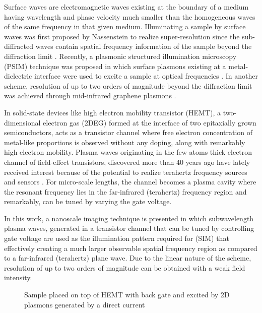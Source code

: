 \documentclass[11pt]{article}
\begin{document}
Surface waves are electromagnetic waves existing at the boundary of a medium having wavelength and phase velocity much smaller than the homogeneous waves of the same frequency in that given medium. Illuminating a sample by surface waves was first proposed by Nassenstein to realize super-resolution since the sub-diffracted waves contain spatial frequency information of the sample beyond the diffraction limit \cite{Nassenstein1970}. Recently, a plasmonic structured illumination microscopy (PSIM) technique was proposed in which surface plasmons existing at a metal-dielectric interface were used to excite a sample at optical frequencies \cite{Wei2010}. In another scheme, resolution of up to two orders of magnitude beyond the diffraction limit was achieved through mid-infrared graphene plasmons \cite{Zeng2014}.

In solid-state devices like high electron mobility transistor (HEMT), a two-dimensional electron gas (2DEG) formed at the interface of two epitaxially grown semiconductors, acts as a transistor channel where free electron concentration of metal-like proportions is observed without any doping, along with remarkably high electron mobility. Plasma waves originating in the few atoms thick electron channel of field-effect transistors, discovered more than 40 years ago have lately received interest because of the potential to realize terahertz frequency sources and sensors \cite{Dyakonov1993,Dyakonov1996,Popov2005,Otsuji2006,Muravjov2010}. For micro-scale lengths, the channel becomes a plasma cavity where the resonant frequency lies in the far-infrared (terahertz) frequency region and remarkably, can be tuned by varying the gate voltage.

In this work, a nanoscale imaging technique is presented in which subwavelength plasma waves, generated in a transistor channel that can be tuned by controlling gate voltage are used as the illumination pattern required for (SIM) that effectively creating a much larger observable spatial frequency region as compared to a far-infrared (terahertz) plane wave. Due to the linear nature of the scheme, resolution of up to two orders of magnitude can be obtained with a weak field intensity.
%
\begin{figure}[t!]
  \centering
  \def\svgwidth{\linewidth}
  
  \caption{Sample placed on top of HEMT with back gate and excited by 2D plasmons generated by a direct current}
  \label{fig:struct}
\end{figure}
%
\end{document}
